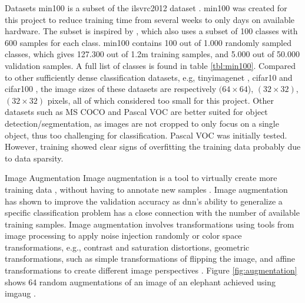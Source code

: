\begin{enumdescript}
\begin{enumdescript}
		\item[Datasets] \gls{min100} is a subset of the \gls{ilsvrc2012} dataset \cite{russakovsky_imagenet_2015}. \gls{min100} was created for this project to reduce training time from several weeks to only days on available hardware. The subset is inspired by \cite{vinyals_matching_2016}, which also uses a subset of 100 classes with 600 samples for each class. \gls{min100} contains 100 out of 1.000 randomly sampled classes, which gives 127.300 out of 1.2m training samples, and 5.000 out of 50.000 validation samples. A full list of classes is found in table \ref{tbl:min100}. 
		Compared to other sufficiently dense classification datasets, e.g, \gls{tinyimagenet} \cite{li_cs231n:_2018}, \gls{cifar10} and \gls{cifar100} \cite{krizhevsky_cifar-10_nodate}, the image sizes of these datasets are respectively $(64\times 64$), $(32\times 32)$, $(32\times 32)$ pixels, all of which considered too small for this project. Other datasets such as MS COCO and Pascal VOC are better suited for object detection/segmentation, as images are not cropped to only focus on a single object, thus too challenging for classification. Pascal VOC was initially tested. However, training showed clear signs of overfitting the training data probably due to data sparsity. 
		
		\item[Image Augmentation] Image augmentation is a tool to virtually create more training data \cite{perez_effectiveness_2017}, without having to annotate new samples \cite{goodfellow_deep_2016}. Image augmentation has shown to improve the validation accuracy as \gls{dnn}'s ability to generalize a specific classification problem has a close connection with the number of available training samples.
		Image augmentation involves transformations using tools from image processing to apply noise injection randomly or color space transformations, e.g., contrast and saturation distortions, geometric transformations, such as simple transformations of flipping the image, and affine transformations to create different image perspectives \cite{shorten_survey_2019}. Figure \ref{fig:augmentation} shows 64 random augmentations of an image of an elephant achieved using \gls{imgaug} \cite{jung_imgaug:_nodate}.  
		

\end{enumdescript}
\end{enumdescript}
